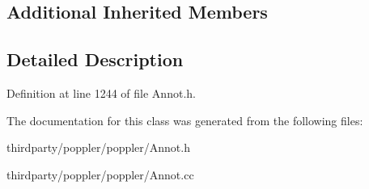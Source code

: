 \subsection*{Additional Inherited Members}


\subsection{Detailed Description}


Definition at line 1244 of file Annot.\+h.



The documentation for this class was generated from the following files\+:\begin{DoxyCompactItemize}
\item 
thirdparty/poppler/poppler/Annot.\+h\item 
thirdparty/poppler/poppler/Annot.\+cc\end{DoxyCompactItemize}

